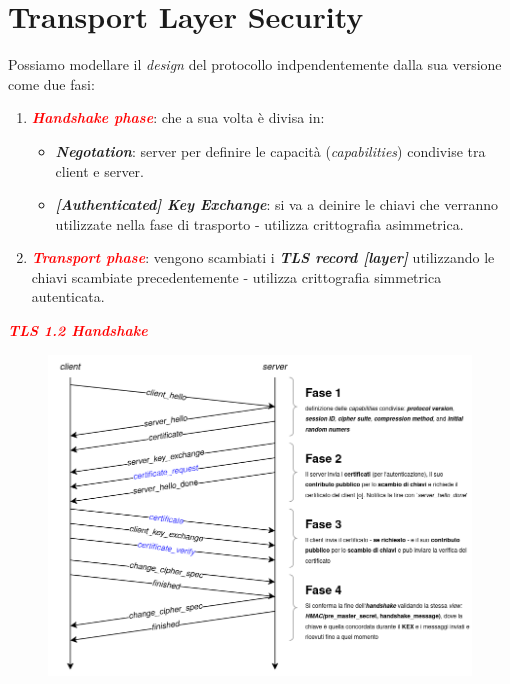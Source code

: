 \newpage

\section{Transport Layer Security}

\begin{flushleft}
    Possiamo modellare il \textit{design} del protocollo indpendentemente dalla sua versione come due fasi:
    \begin{enumerate}[nosep]
        \item \textcolor{red}{\textbf{\textit{Handshake phase}}}: che a sua volta è divisa in:
        \begin{itemize}[nosep]
            \item \textbf{\textit{Negotation}}: server per definire le capacità (\textit{capabilities}) condivise tra client e server.
            \item \textbf{\textit{[Authenticated] Key Exchange}}: si va a deinire le chiavi che verranno utilizzate nella fase di trasporto - utilizza crittografia asimmetrica.
        \end{itemize}
        \item \textcolor{red}{\textbf{\textit{Transport phase}}}: vengono scambiati i \textbf{\textit{TLS record [layer]}} utilizzando le chiavi scambiate precedentemente - utilizza crittografia simmetrica autenticata.
    \end{enumerate}

    \textcolor{red}{\textbf{\textit{TLS 1.2 Handshake}}}

    \begin{figure}[h]
        \centering
        \includegraphics[width=\textwidth]{img/tls_handshake.png}
    \end{figure}


\end{flushleft}
